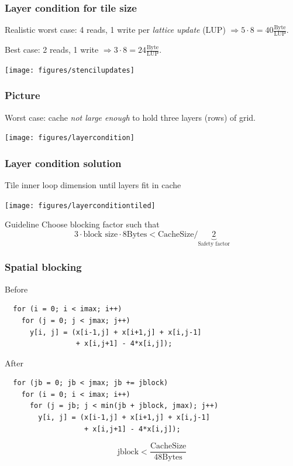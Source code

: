 \documentclass[presentation,aspectratio=43,10pt]{beamer}
\begin{document}
\begin{frame}
  \frametitle{Layer condition for tile size}
  Realistic worst case: 4 reads, 1 write per \emph{lattice update} (LUP) $\Rightarrow
    5 \cdot 8 = 40 \frac{\text{Byte}}{\text{LUP}}$.

    Best case: 2 reads, 1 write $\Rightarrow 3 \cdot 8 = 24\frac{\text{Byte}}{\text{LUP}}$.
  \begin{center}
    \texttt{[image: figures/stencilupdates]}
  \end{center}
\end{frame}
\begin{frame}
  \frametitle{Picture}
  Worst case: cache \emph{not large enough} to hold three layers
  (rows) of grid.
  \begin{center}
    \texttt{[image: figures/layercondition]}
  \end{center}
\end{frame}
\begin{frame}
  \frametitle{Layer condition solution}
  Tile inner loop dimension until layers fit in cache
  \begin{center}
    \texttt{[image: figures/layerconditiontiled]}
  \end{center}
  \begin{answer}{Guideline}
    Choose blocking factor such that
    \begin{equation*}
      3 \cdot \text{block size} \cdot 8 \text{Bytes} <
      \text{CacheSize} / \underbrace{2}_{\text{Safety factor}}
    \end{equation*}
  \end{answer}
\end{frame}
\begin{frame}[fragile]
  \frametitle{Spatial blocking}
  \begin{challenge}{Before}
\begin{verbatim}
  for (i = 0; i < imax; i++)
    for (j = 0; j < jmax; j++)
      y[i, j] = (x[i-1,j] + x[i+1,j] + x[i,j-1] 
                 + x[i,j+1] - 4*x[i,j]);
\end{verbatim}
  \end{challenge}
  \begin{answer}{After}
\begin{verbatim}
  for (jb = 0; jb < jmax; jb += jblock)
    for (i = 0; i < imax; i++)
      for (j = jb; j < min(jb + jblock, jmax); j++)
        y[i, j] = (x[i-1,j] + x[i+1,j] + x[i,j-1] 
                   + x[i,j+1] - 4*x[i,j]);
\end{verbatim}
    \begin{equation*}
      \text{jblock} < \frac{\text{CacheSize}}{48 \text{Bytes}}
    \end{equation*}
  \end{answer}
\end{frame}
\end{document}
